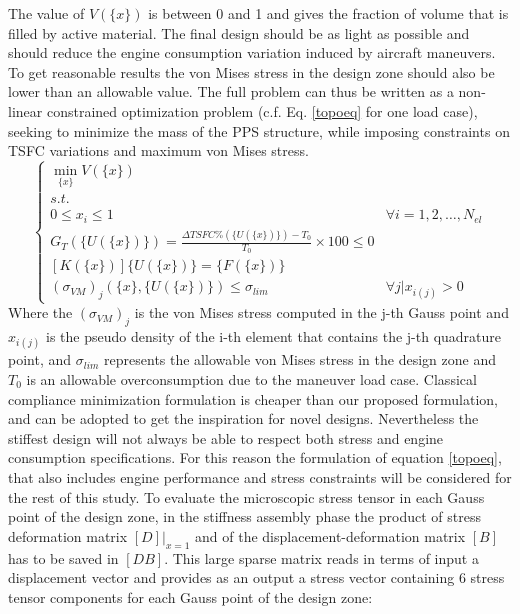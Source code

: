  The value of $V\left(\lbrace x\rbrace\right)$ is between 0 and 1 and gives the fraction of volume that is filled by active material.
 The final design should be as light as possible and should reduce the engine consumption variation induced by aircraft maneuvers.   
 To get reasonable results the von Mises stress in the design zone should also be lower than an allowable value.
 The full problem can thus be written as a non-linear constrained optimization problem (c.f. Eq. \ref{topoeq} for one load case), seeking to minimize the mass of the PPS structure, while imposing constraints on TSFC variations and maximum von Mises stress.
 \begin{equation}
 \label{topoeq}
 \left\lbrace\begin{array}{cc}
 \underset{\lbrace x\rbrace}{\min} V\left(\lbrace x\rbrace\right)& \\
 s.t. & \\ 0\leq x_i \leq 1  & \forall i=1,2,\dots,N_{el}\\
 G_T\left(\lbrace U\left(\lbrace x\rbrace\right)\rbrace\right)=\frac{\Delta TSFC \%\left(\lbrace U\left(\lbrace x\rbrace\right)\rbrace\right)-T_0}{T_0}\times 100 \leq 0 & \\
 \left[K\left(\lbrace x\rbrace\right)\right]\lbrace U \left(\lbrace x\rbrace\right) \rbrace = \lbrace F \left(\lbrace x\rbrace\right)\rbrace & \\
 (\sigma_{VM})_j\left(\lbrace x\rbrace,\lbrace U\left(\lbrace x\rbrace\right)\rbrace\right) \leq \sigma_{lim}  & \forall j| x_{i(j)}> 0
 \end{array}\right.
 \end{equation}
 Where the $(\sigma_{VM})_j$ is the von Mises stress computed in the j-th Gauss point and $x_{i(j)}$ is the pseudo density of the i-th element that contains the j-th quadrature point, and $\sigma_{lim}$ represents the allowable von Mises stress in the design zone and $T_0$ is an allowable overconsumption due to the maneuver load case. Classical compliance minimization formulation is cheaper than our proposed formulation, and can be adopted to get the inspiration for novel designs. Nevertheless the stiffest design will not always be able to respect both stress and engine consumption specifications. For this reason the formulation of equation \ref{topoeq}, that also includes engine performance and stress constraints will be considered for the rest of this study.
 To evaluate the microscopic stress tensor in each Gauss point of the design zone, in the stiffness assembly phase the product of stress deformation matrix $\left[D\right]|_{x=1}$ and of the displacement-deformation matrix $\left[B\right]$ has to be saved in  $\left[DB\right]$. This large sparse matrix reads in terms of input a displacement vector and provides as an output a stress vector containing 6 stress tensor components  for each Gauss point of the design zone:
